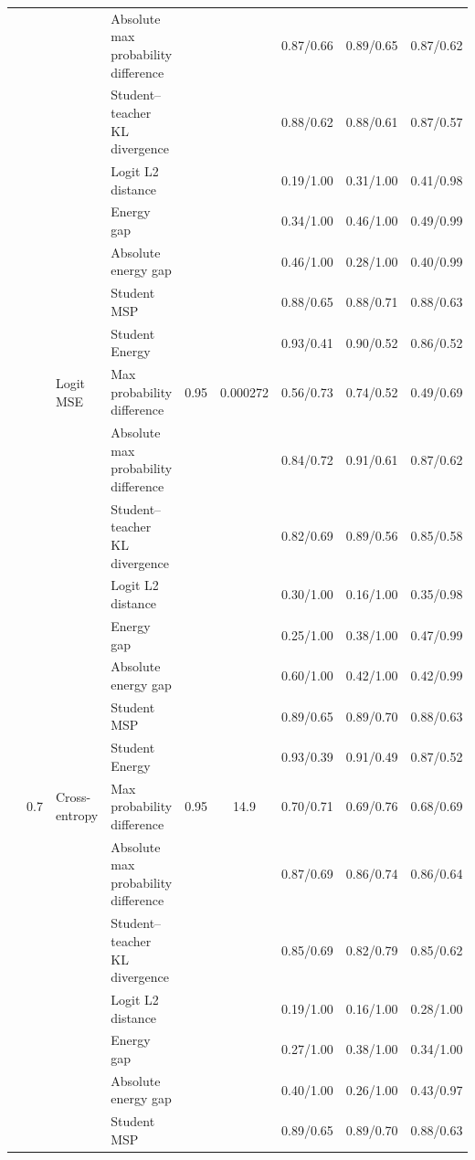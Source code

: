 \documentclass[border=2pt]{standalone}
\begin{document}
\begin{tabular}{llllccccc}
 &  &  & Absolute max probability difference &  &  & 0.87/0.66 & 0.89/0.65 & 0.87/0.62 \\
 &  &  & Student--teacher KL divergence &  &  & 0.88/0.62 & 0.88/0.61 & 0.87/0.57 \\
 &  &  & Logit L2 distance &  &  & 0.19/1.00 & 0.31/1.00 & 0.41/0.98 \\
 &  &  & Energy gap &  &  & 0.34/1.00 & 0.46/1.00 & 0.49/0.99 \\
 &  &  & Absolute energy gap &  &  & 0.46/1.00 & 0.28/1.00 & 0.40/0.99 \\
 &  &  & Student MSP &  &  & 0.88/0.65 & 0.88/0.71 & 0.88/0.63 \\
 &  &  & Student Energy &  &  & 0.93/0.41 & 0.90/0.52 & 0.86/0.52 \\
\addlinespace
 &  & Logit MSE & Max probability difference & 0.95 & 0.000272 & 0.56/0.73 & 0.74/0.52 & 0.49/0.69 \\
 &  &  & Absolute max probability difference &  &  & 0.84/0.72 & 0.91/0.61 & 0.87/0.62 \\
 &  &  & Student--teacher KL divergence &  &  & 0.82/0.69 & 0.89/0.56 & 0.85/0.58 \\
 &  &  & Logit L2 distance &  &  & 0.30/1.00 & 0.16/1.00 & 0.35/0.98 \\
 &  &  & Energy gap &  &  & 0.25/1.00 & 0.38/1.00 & 0.47/0.99 \\
 &  &  & Absolute energy gap &  &  & 0.60/1.00 & 0.42/1.00 & 0.42/0.99 \\
 &  &  & Student MSP &  &  & 0.89/0.65 & 0.89/0.70 & 0.88/0.63 \\
 &  &  & Student Energy &  &  & 0.93/0.39 & 0.91/0.49 & 0.87/0.52 \\
\addlinespace
 & 0.7 & Cross-entropy & Max probability difference & 0.95 & 14.9 & 0.70/0.71 & 0.69/0.76 & 0.68/0.69 \\
 &  &  & Absolute max probability difference &  &  & 0.87/0.69 & 0.86/0.74 & 0.86/0.64 \\
 &  &  & Student--teacher KL divergence &  &  & 0.85/0.69 & 0.82/0.79 & 0.85/0.62 \\
 &  &  & Logit L2 distance &  &  & 0.19/1.00 & 0.16/1.00 & 0.28/1.00 \\
 &  &  & Energy gap &  &  & 0.27/1.00 & 0.38/1.00 & 0.34/1.00 \\
 &  &  & Absolute energy gap &  &  & 0.40/1.00 & 0.26/1.00 & 0.43/0.97 \\
 &  &  & Student MSP &  &  & 0.89/0.65 & 0.89/0.70 & 0.88/0.63 \\

\end{tabular}
\end{document}

